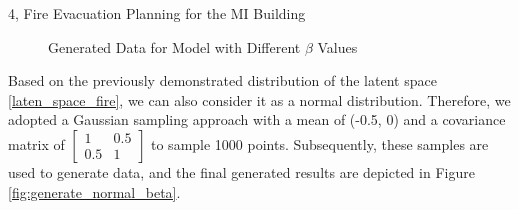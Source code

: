\begin{task}{4, Fire Evacuation Planning for the MI Building}
\begin{figure}[ht]
\hfill
{}
\hfill
{}
\caption{Generated Data for Model with Different \(\beta\) Values}
\label{fig:generate_lin_beta}
\end{figure}

Based on the previously demonstrated distribution of the latent space \ref{laten_space_fire}, we can also consider it as a normal distribution. Therefore, we adopted a Gaussian sampling approach with a mean of (-0.5, 0) and a covariance matrix of \(\begin{bmatrix}1 & 0.5\\ 0.5 & 1\end{bmatrix}\) to sample 1000 points. Subsequently, these samples are used to generate data, and the final generated results are depicted in Figure \ref{fig:generate_normal_beta}.

\begin{figure}[ht]
\centering


\end{figure}
\end{task}
